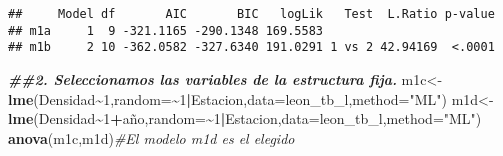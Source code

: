 \documentclass[
]{article}
\newenvironment{Shaded}{\begin{snugshade}}{\end{snugshade}}
\newcommand{\AttributeTok}[1]{\textcolor[rgb]{0.13,0.29,0.53}{#1}}
\newcommand{\CommentTok}[1]{\textcolor[rgb]{0.56,0.35,0.01}{\textit{#1}}}
\newcommand{\DecValTok}[1]{\textcolor[rgb]{0.00,0.00,0.81}{#1}}
\newcommand{\DocumentationTok}[1]{\textcolor[rgb]{0.56,0.35,0.01}{\textbf{\textit{#1}}}}
\newcommand{\FunctionTok}[1]{\textcolor[rgb]{0.13,0.29,0.53}{\textbf{#1}}}
\newcommand{\NormalTok}[1]{#1}
\newcommand{\OtherTok}[1]{\textcolor[rgb]{0.56,0.35,0.01}{#1}}
\newcommand{\SpecialCharTok}[1]{\textcolor[rgb]{0.81,0.36,0.00}{\textbf{#1}}}
\newcommand{\StringTok}[1]{\textcolor[rgb]{0.31,0.60,0.02}{#1}}
\begin{document}
\begin{Shaded}
\end{Shaded}

\begin{verbatim}
##     Model df       AIC       BIC   logLik   Test  L.Ratio p-value
## m1a     1  9 -321.1165 -290.1348 169.5583                        
## m1b     2 10 -362.0582 -327.6340 191.0291 1 vs 2 42.94169  <.0001
\end{verbatim}

\begin{Shaded}
\begin{Highlighting}[]
\DocumentationTok{\#\#2. Seleccionamos las variables de la estructura fija.}
\NormalTok{m1c}\OtherTok{\textless{}{-}}\FunctionTok{lme}\NormalTok{(Densidad}\SpecialCharTok{\textasciitilde{}}\DecValTok{1}\NormalTok{,}\AttributeTok{random=}\SpecialCharTok{\textasciitilde{}}\DecValTok{1}\SpecialCharTok{|}\NormalTok{Estacion,}\AttributeTok{data=}\NormalTok{leon\_tb\_l,}\AttributeTok{method=}\StringTok{"ML"}\NormalTok{)}
\NormalTok{m1d}\OtherTok{\textless{}{-}}\FunctionTok{lme}\NormalTok{(Densidad}\SpecialCharTok{\textasciitilde{}}\DecValTok{1}\SpecialCharTok{+}\NormalTok{año,}\AttributeTok{random=}\SpecialCharTok{\textasciitilde{}}\DecValTok{1}\SpecialCharTok{|}\NormalTok{Estacion,}\AttributeTok{data=}\NormalTok{leon\_tb\_l,}\AttributeTok{method=}\StringTok{"ML"}\NormalTok{)}
\FunctionTok{anova}\NormalTok{(m1c,m1d)}\CommentTok{\#El modelo m1d es el elegido}
\end{Highlighting}
\end{Shaded}
\end{document}
